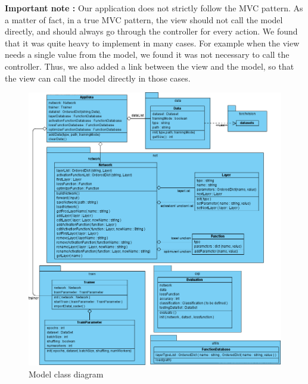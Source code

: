\textbf{Important note :} Our application does not strictly follow the MVC pattern. As a matter of fact, in a true MVC pattern, the view should not call the model directly, and should always go through the controller for every action. We found that it was quite heavy to implement in many cases. For example when the view needs a single value from the model, we found it was not necessary to call the controller. Thus, we also added a link between the view and the model, so that the view can call the model directly in those cases.

\begin{figure}[h!]
    \centering 
    \includegraphics[scale=0.5]{figures/ModelDiagram.png}
    \caption{Model class diagram}
  \end{figure}
  
